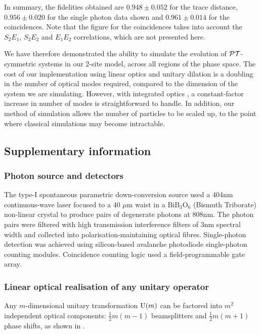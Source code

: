 In summary, the fidelities obtained are \(0.948 \pm 0.052\) for the trace
distance, \(0.956 \pm 0.020\) for the single photon data shown and \(0.961 \pm
0.014\) for the coincidences. Note that the figure for the coincidences takes
into account the \(S_2 E_1\), \(S_2 E_2\) and \(E_1 E_2\) correlations, which
are not presented here.

We have therefore demonstrated the ability to simulate the evolution of
\(\mathcal{PT}\)-symmetric systems in our 2-site model, across all regions of the phase
space. The cost of our implementation using linear optics and unitary dilation
is a doubling in the number of optical modes required, compared to the dimension
of the system we are simulating. However, with integrated optics
, a constant-factor increase in number of modes is
straightforward to handle. In addition, our method of simulation allows the
number of particles to be scaled up, to the point where classical simulations
may become intractable.

\subsection{Supplementary information}
\subsubsection{Photon source and detectors}
The type-I spontaneous parametric down-conversion source used a 404nm
continuous-wave laser focused to a 40 \(\mu\)m waist in a \(\text{BiB}_3
\text{O}_6\) (Bismuth Triborate) non-linear crystal to produce pairs of
degenerate photons at 808nm. The photon pairs were filtered with high
transmission interference filters of 3nm spectral width and collected into
polarisation-maintaining optical fibres. Single-photon detection was achieved
using silicon-based avalanche photodiode single-photon counting modules.
Coincidence counting logic used a field-programmable gate array.

\subsubsection{Linear optical realisation of any unitary operator}
Any \(m\)-dimensional unitary transformation \(\mathrm{U} \!\left(m\right)\) can be factored
into \(m^{2}\) independent optical components: \(\frac{1}{2} m \left( m-1
\right) \) beamsplitters and \(\frac{1}{2} m \left( m+1 \right) \) phase shifts,
as shown in \cite{reck}.

